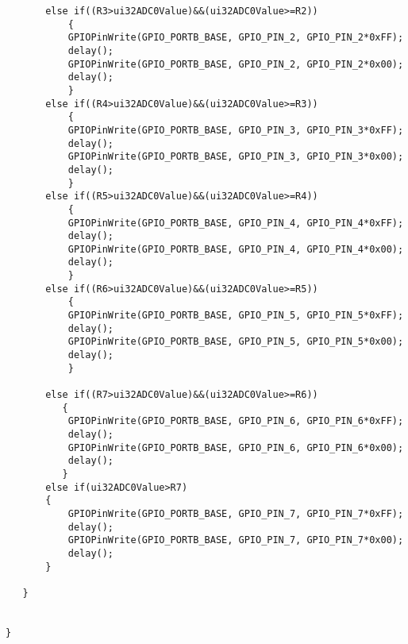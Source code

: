 \begin{lstlisting}
       else if((R3>ui32ADC0Value)&&(ui32ADC0Value>=R2))
           {
           GPIOPinWrite(GPIO_PORTB_BASE, GPIO_PIN_2, GPIO_PIN_2*0xFF);
           delay();
           GPIOPinWrite(GPIO_PORTB_BASE, GPIO_PIN_2, GPIO_PIN_2*0x00);
           delay();
           }
       else if((R4>ui32ADC0Value)&&(ui32ADC0Value>=R3))
           {
           GPIOPinWrite(GPIO_PORTB_BASE, GPIO_PIN_3, GPIO_PIN_3*0xFF);
           delay();
           GPIOPinWrite(GPIO_PORTB_BASE, GPIO_PIN_3, GPIO_PIN_3*0x00);
           delay();
           }
       else if((R5>ui32ADC0Value)&&(ui32ADC0Value>=R4))
           {
           GPIOPinWrite(GPIO_PORTB_BASE, GPIO_PIN_4, GPIO_PIN_4*0xFF);
           delay();
           GPIOPinWrite(GPIO_PORTB_BASE, GPIO_PIN_4, GPIO_PIN_4*0x00);
           delay();
           }
       else if((R6>ui32ADC0Value)&&(ui32ADC0Value>=R5))
           {
           GPIOPinWrite(GPIO_PORTB_BASE, GPIO_PIN_5, GPIO_PIN_5*0xFF);
           delay();
           GPIOPinWrite(GPIO_PORTB_BASE, GPIO_PIN_5, GPIO_PIN_5*0x00);
           delay();
           }

       else if((R7>ui32ADC0Value)&&(ui32ADC0Value>=R6))
          {
           GPIOPinWrite(GPIO_PORTB_BASE, GPIO_PIN_6, GPIO_PIN_6*0xFF);
           delay();
           GPIOPinWrite(GPIO_PORTB_BASE, GPIO_PIN_6, GPIO_PIN_6*0x00);
           delay();
          }
       else if(ui32ADC0Value>R7)
       {
           GPIOPinWrite(GPIO_PORTB_BASE, GPIO_PIN_7, GPIO_PIN_7*0xFF);
           delay();
           GPIOPinWrite(GPIO_PORTB_BASE, GPIO_PIN_7, GPIO_PIN_7*0x00);
           delay();
       }

   }


}



\end{lstlisting}
